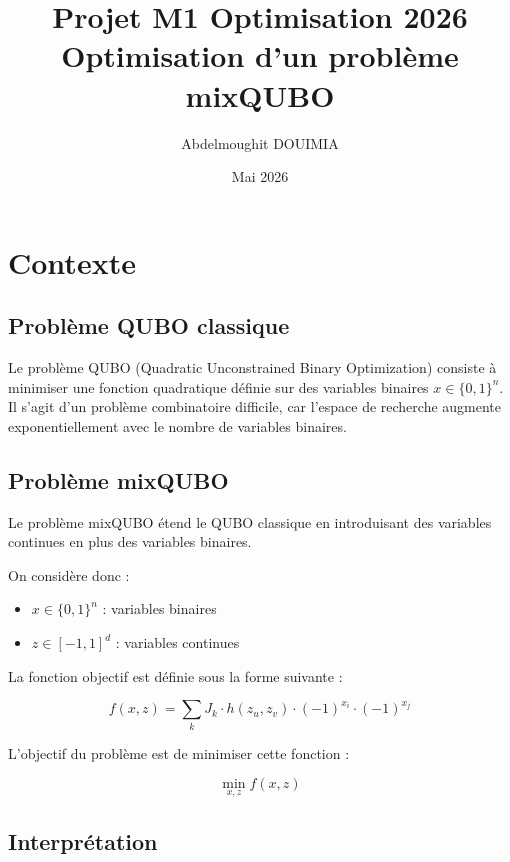 \documentclass[a4paper,11pt]{article}
\title{Projet M1 Optimisation 2026 \\ Optimisation d’un problème mixQUBO}
\author{Abdelmoughit DOUIMIA}
\date{Mai 2026}
\begin{document}
\maketitle

\tableofcontents

\newpage

\section{Contexte}

\subsection{Problème QUBO classique}

Le problème QUBO (Quadratic Unconstrained Binary Optimization) consiste à minimiser une fonction quadratique définie sur des variables binaires $x \in \{0,1\}^n$. 
Il s'agit d'un problème combinatoire difficile, car l'espace de recherche augmente exponentiellement avec le nombre de variables binaires.

\subsection{Problème mixQUBO}

Le problème mixQUBO étend le QUBO classique en introduisant des variables continues en plus des variables binaires.

On considère donc :
\begin{itemize}
    \item $x \in \{0,1\}^n$ : variables binaires
    \item $z \in [-1,1]^d$ : variables continues
\end{itemize}

La fonction objectif est définie sous la forme suivante :

\begin{equation}
f(x,z) = \sum_{k} J_k \cdot h(z_u, z_v) \cdot (-1)^{x_i} \cdot (-1)^{x_j}
\end{equation}

L'objectif du problème est de minimiser cette fonction :

\begin{equation}
\min_{x,z} f(x,z)
\end{equation}

\subsection{Interprétation}
\end{document}
